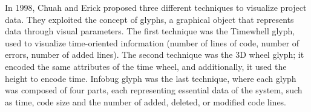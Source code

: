In 1998, Chuah and Erick \cite{Chuah1998} proposed three different techniques to visualize project data. 
They exploited the concept of glyphs, a graphical object that represents data through visual parameters. 
The first technique was the Timewhell glyph, used to visualize time-oriented information (number of lines of code, number of errors, number of added lines). 
The second technique was the 3D wheel glyph; it encoded the same attributes of the time wheel, and additionally, it used the height to encode time. 
Infobug glyph was the last technique, where each glyph was composed of four parts, each representing essential data of the system, such as time, code size and the number of added, deleted, or modified code lines. \newline

